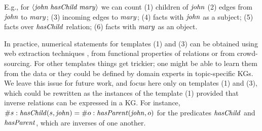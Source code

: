 


E.g., for $\mathit{\langle john\;hasChild\;mary\rangle}$ we %
can count
(1) children of $\mathit{john}$ %
(2) edges from $\mathit{john}$ to $\mathit{mary}$; %
(3) incoming edges to $\mathit{mary}$; %
(4) %
facts with $\mathit{john}$ as a subject; (5) %
facts over $\mathit{hasChild}$ relation; (6) %
facts with $\mathit{mary}$ as an object. 

In practice, numerical statements for templates (1) and (3) can be obtained using web extraction techniques \cite{cardinality-extraction-iswc-2016}, from functional properties of relations or from crowd-sourcing. For other templates things get trickier; one might be able to learn  
them from the data or they could be defined by domain experts in topic-specific KGs. We leave this issue for future work, and focus here only on templates (1) and (3), which could be rewritten as the instances of the template (1) provided that inverse relations can be expressed in a KG. For instance, $\# s: \mathit{hasChild}(s,\mathit{john})=\# o: \mathit{hasParent}(\mathit{john},o)$ for the predicates $\mathit{hasChild}$ and $\mathit{hasParent}$, which are %
inverses of one another. %

